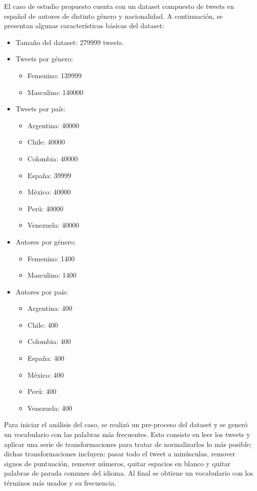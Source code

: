 \documentclass[11pt,a4paper]{article}
\begin{document}
El caso de estudio propuesto cuenta con un dataset compuesto de tweets en español de autores de distinto género y nacionalidad. A continuación, se presentan algunas características básicas del dataset: 

\begin{itemize}
\item Tamaño del dataset: 279999 tweets.
\item Tweets por género:
  \begin{itemize}
	\item Femenino: 139999
	\item Masculino: 140000
  \end{itemize}
\item Tweets por país:
  \begin{itemize}
	\item Argentina: 40000
	\item Chile: 40000
	\item Colombia:  40000
	\item España: 39999
	\item México: 40000
	\item Perú: 40000
	\item Venezuela: 40000
  \end{itemize}
\item Autores por género: 
  \begin{itemize}
	\item Femenino: 1400
	\item Masculino: 1400
  \end{itemize}
\item Autores por país:
  \begin{itemize}
	\item Argentina: 400
	\item Chile: 400
	\item Colombia:  400
	\item España: 400
	\item México: 400
	\item Perú: 400
	\item Venezuela: 400
  \end{itemize}
\end{itemize}

Para iniciar el análisis del caso, se realizó un pre-proceso del dataset y se generó un vocabulario con las palabras más frecuentes. Esto consiste en leer los tweets y aplicar una serie de transformaciones para tratar de normalizarlos lo más posible; dichas transformaciones incluyen: pasar todo el tweet a minúsculas, remover signos de puntuación, remover números, quitar espacios en blanco y quitar palabras de parada comunes del idioma. Al final se obtiene un vocabulario con los términos más usados y su frecuencia. 
\end{document}
